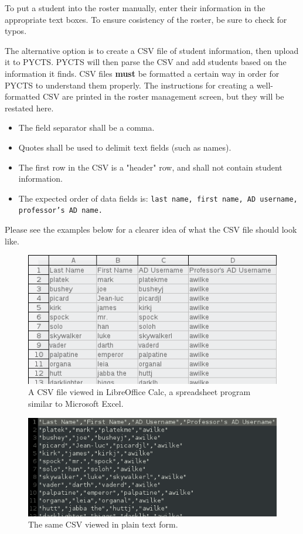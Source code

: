 \documentclass[letterpaper,titlepage]{article}
\begin{document}
To put a student into the roster manually, enter their information in the appropriate text boxes. To ensure cosistency of the roster, be sure to check for typos.

The alternative option is to create a CSV file of student information, then upload it to PYCTS. PYCTS will then parse the CSV and add students based on the information it finds. CSV files \textbf{must} be formatted a certain way in order for PYCTS to understand them properly. The instructions for creating a well-formatted CSV are printed in the roster management screen, but they will be restated here.

\begin{itemize}
\item{The field separator shall be a comma.}
\item{Quotes shall be used to delimit text fields (such as names).}
\item{The first row in the CSV is a "header" row, and shall not contain student information.}
\item{The expected order of data fields is: \tt last name, first name, AD username, professor's AD name.\rm}
\end{itemize}

Please see the examples below for a clearer idea of what the CSV file should look like.

\begin{figure}[H]
\includegraphics[width=\textwidth]{images/prof_csv-lo.png}
\caption{A CSV file viewed in LibreOffice Calc, a spreadsheet program similar to Microsoft Excel.}
\label{prof_csv-lo}
\end{figure}

\begin{figure}[H]
\includegraphics[width=\textwidth]{images/prof_csv-text.png}
\caption{The same CSV viewed in plain text form.}
\label{prof_csv-text}
\end{figure}
\end{document}
